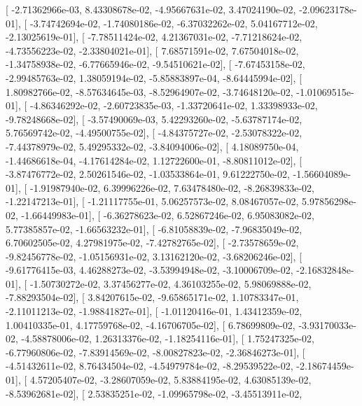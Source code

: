 \documentclass{article}
\begin{document}
       [ -2.71362966e-03,   8.43308678e-02,  -4.95667631e-02,
          3.47024190e-02,  -2.09623178e-01],
       [ -3.74742694e-02,  -1.74080186e-02,  -6.37032262e-02,
          5.04167712e-02,  -2.13025619e-01],
       [ -7.78511424e-02,   4.21367031e-02,  -7.71218624e-02,
         -4.73556223e-02,  -2.33804021e-01],
       [  7.68571591e-02,   7.67504018e-02,  -1.34758938e-02,
         -6.77665946e-02,  -9.54510621e-02],
       [ -7.67453158e-02,  -2.99485763e-02,   1.38059194e-02,
         -5.85883897e-04,  -8.64445994e-02],
       [  1.80982766e-02,  -8.57634645e-03,  -8.52964907e-02,
         -3.74648120e-02,  -1.01069515e-01],
       [ -4.86346292e-02,  -2.60723835e-03,  -1.33720641e-02,
          1.33398933e-02,  -9.78248668e-02],
       [ -3.57490069e-03,   5.42293260e-02,  -5.63787174e-02,
          5.76569742e-02,  -4.49500755e-02],
       [ -4.84375727e-02,  -2.53078322e-02,  -7.44378979e-02,
          5.49295332e-02,  -3.84094006e-02],
       [  4.18089750e-04,  -1.44686618e-04,  -4.17614284e-02,
          1.12722600e-01,  -8.80811012e-02],
       [ -3.87476772e-02,   2.50261546e-02,  -1.03533864e-01,
          9.61222750e-02,  -1.56604089e-01],
       [ -1.91987940e-02,   6.39996226e-02,   7.63478480e-02,
         -8.26839833e-02,  -1.22147213e-01],
       [ -1.21117755e-01,   5.06257573e-02,   8.08467057e-02,
          5.97856298e-02,  -1.66449983e-01],
       [ -6.36278623e-02,   6.52867246e-02,   6.95083082e-02,
          5.77385857e-02,  -1.66563232e-01],
       [ -6.81058839e-02,  -7.96835049e-02,   6.70602505e-02,
          4.27981975e-02,  -7.42782765e-02],
       [ -2.73578659e-02,  -9.82456778e-02,  -1.05156931e-02,
          3.13162120e-02,  -3.68206246e-02],
       [ -9.61776415e-03,   4.46288273e-02,  -3.53994948e-02,
         -3.10006709e-02,  -2.16832848e-01],
       [ -1.50730272e-02,   3.37456277e-02,   4.36103255e-02,
          5.98069888e-02,  -7.88293504e-02],
       [  3.84207615e-02,  -9.65865171e-02,   1.10783347e-01,
         -2.11011213e-02,  -1.98841827e-01],
       [ -1.01120416e-01,   1.43412359e-02,   1.00410335e-01,
          4.17759768e-02,  -4.16706705e-02],
       [  6.78699809e-02,  -3.93170033e-02,  -4.58878006e-02,
          1.26313376e-02,  -1.18254116e-01],
       [  1.75247325e-02,  -6.77960806e-02,  -7.83914569e-02,
         -8.00827823e-02,  -2.36846273e-01],
       [ -4.51432611e-02,   8.76434504e-02,  -4.54979784e-02,
         -8.29539522e-02,  -2.18674459e-01],
       [  4.57205407e-02,  -3.28607059e-02,   5.83884195e-02,
          4.63085139e-02,  -8.53962681e-02],
       [  2.53835251e-02,  -1.09965798e-02,  -3.45513911e-02,
\end{document}
